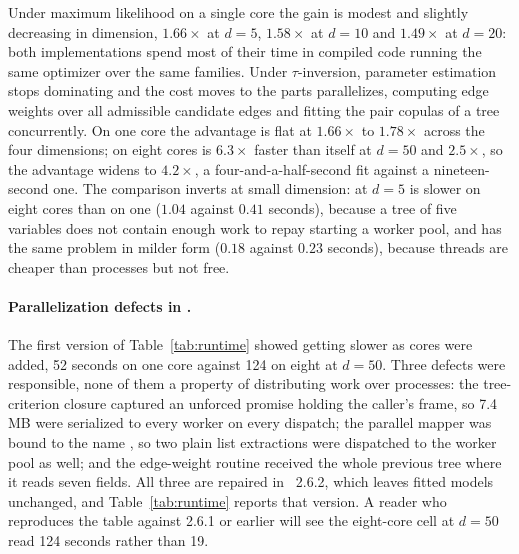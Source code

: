 \documentclass[article]{jss}
\begin{document}
Under maximum likelihood on a single core the gain is modest and slightly
decreasing in dimension, $1.66\times$ at $d = 5$, $1.58\times$ at $d = 10$
and $1.49\times$ at $d = 20$: both implementations spend most of their time
in compiled code running the same optimizer over the same families.  Under
$\tau$-inversion, parameter estimation stops dominating and the cost moves to
the parts  parallelizes, computing edge weights over all
admissible candidate edges and fitting the pair copulas of a tree
concurrently.  On one core the advantage is flat at $1.66\times$ to
$1.78\times$ across the four dimensions; on eight cores  is
$6.3\times$ faster than itself at $d = 50$ and  $2.5\times$,
so the advantage widens to $4.2\times$, a four-and-a-half-second fit against
a nineteen-second one.  The comparison inverts at small dimension: at $d = 5$
 is slower on eight cores than on one ($1.04$ against $0.41$
seconds), because a tree of five variables does not contain enough work to
repay starting a worker pool, and  has the same problem in
milder form ($0.18$ against $0.23$ seconds), because threads are cheaper than
processes but not free.

\paragraph{Parallelization defects in .}  The first version
of Table~\ref{tab:runtime} showed  getting slower as cores
were added, 52 seconds on one core against 124 on eight at $d = 50$.  Three
defects were responsible, none of them a property of distributing work over
processes: the tree-criterion closure captured an unforced promise holding the
caller's frame, so 7.4\,MB were serialized to every worker on every dispatch;
the parallel mapper was bound to the name , so two plain list
extractions were dispatched to the worker pool as well; and the edge-weight
routine received the whole previous tree where it reads seven fields.  All
three are repaired in ~2.6.2, which leaves fitted models
unchanged, and Table~\ref{tab:runtime} reports that version.  A reader who
reproduces the table against 2.6.1 or earlier will see the eight-core cell at
$d = 50$ read 124 seconds rather than 19.
\end{document}
